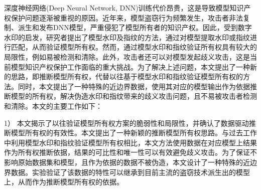 

\begin{zhaiyao}

%
%
%
%

深度神经网络(Deep Neural Network, DNN)训练代价昂贵，这是导致模型知识产权保护问题逐渐被重视的原因。近年来，模型盗窃行为频繁发生，攻击者非法复制、派生和发布DNN模型，严重侵犯了模型所有者的知识产权。因此，受到数字水印的启发，研究者提出了模型水印及指纹的方法，通过对模型提取水印或指纹进行匹配，从而验证模型所有权。然而，通过模型水印和指纹验证所有权具有较大的局限性，例如易被检测和清除。此外，攻击者还可以对模型发起歧义攻击，这是当前模型知识产权保护工作面临的重大挑战。为了解决上述问题，本文提出了一种新的思路，即推断模型所有权，代替以往基于模型水印和指纹验证模型所有权的方法。同时，本文提出了一种特殊的近边界数据，使用其对应的模型输出作为依据推断模型的所有权，解决伪造水印和指纹带来的歧义攻击问题，且不易被攻击者检测和清除。本文的主要工作如下：

1） 本文揭示了以往验证模型所有权方案的脆弱性和局限性，并确认了数据驱动推断模型所有权的有效性。本文提出了一种新颖的推断模型所有权思路。与过去工作中利用模型水印和指纹验证模型所有权相比，本文方法使用数据在对应模型上结果作为所有权推断依据，结果的可比性和唯一性可以有效避免歧义攻击。为了保证不影响原始数据集和模型，且作为依据的数据不被伪造，本文设计了一种特殊的近边界数据。实验验证了该数据的特性可以继承到目前主流的盗窃技术派生出的模型上，从而作为推断模型所有权的依据。


\end{zhaiyao}
